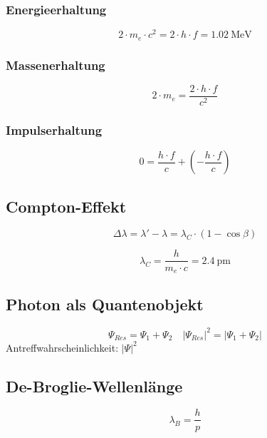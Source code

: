 \subsubsection{Energieerhaltung}
\begin{equation}\label{eq:zerstrahlung:energieerhaltung}
2\cdot m_e \cdot c^2 = 2 \cdot h \cdot f =
\SI{1.02}{\mega\electronvolt}
\end{equation}

\subsubsection{Massenerhaltung}
\begin{equation}\label{eq:zerstrahlung:massenerhaltung}
2 \cdot m_e = \frac{2 \cdot h\cdot f}{c^2}
\end{equation}

\subsubsection{Impulserhaltung}
\begin{equation}\label{eq:zerstrahlung:impulserhaltung}
0 = \frac{h \cdot f}{c} + \left( - \frac{h \cdot f}{c} \right) 
\end{equation}

\subsection{Compton-Effekt}
\begin{equation}\label{eq:compton:effekt}
\Delta \lambda = \lambda' - \lambda = \lambda_C \cdot \left(1 - \cos\beta
\right)
\end{equation}

\begin{equation}\label{eq:compton:wellenlaenge}
\lambda_C = \frac{h}{m_e \cdot c} = \SI{2.4}{\pico\meter}
\end{equation}

\subsection{Photon als Quantenobjekt}
\begin{equation}\label{eq:photonquantenobjekt}
\Psi_{Res} = \Psi_1 + \Psi_2 \quad \left|\Psi_{Res}\right|^2 = \left|\Psi_1 +
\Psi_2\right|
\end{equation}
Antreffwahrscheinlichkeit: $\left|\Psi\right|^2$

\subsection{De-Broglie-Wellenlänge}
\begin{equation}\label{eq:debroglie}
\lambda_B = \frac{h}{p}
\end{equation}

